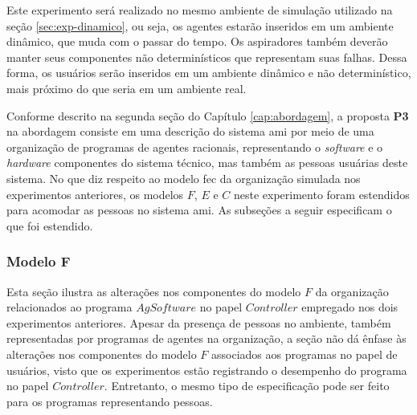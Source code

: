 \begin{figure}[h!]
    \centering
\end{figure}

Este experimento será realizado no mesmo ambiente de simulação utilizado na seção \ref{sec:exp-dinamico}, ou seja, os agentes estarão inseridos em um ambiente dinâmico, que muda com o passar do tempo. Os aspiradores também deverão manter seus componentes não determinísticos que representam suas falhas. Dessa forma, os usuários serão inseridos em um ambiente dinâmico e não determinístico, mais próximo do que seria em um ambiente real. 

Conforme descrito na segunda seção do Capítulo \ref{cap:abordagem}, a proposta \textbf{P3} na abordagem consiste em uma descrição do sistema \acrshort{ami} por meio de uma organização de programas de agentes racionais, representando o \textit{software} e o \textit{hardware} componentes do sistema técnico, mas também as pessoas usuárias deste sistema. No que diz respeito ao modelo \acrshort{fec} da organização simulada nos experimentos anteriores, os modelos $F$, $E$ e $C$ neste experimento foram estendidos para acomodar as pessoas no sistema \acrshort{ami}. As subseções a seguir especificam o que foi estendido. 

\subsubsection{Modelo F}

Esta seção ilustra as alterações nos componentes do modelo $F$ da organização relacionados ao programa $AgSoftware$ no papel $Controller$ empregado nos dois experimentos anteriores. Apesar da presença de pessoas no ambiente, também representadas por programas de agentes na organização, a seção não dá ênfase às alterações nos componentes do modelo $F$ associados aos programas no papel de usuários, visto que os experimentos estão registrando o desempenho do programa no papel $Controller$. Entretanto, o mesmo tipo de especificação pode ser feito para os programas representando pessoas.

